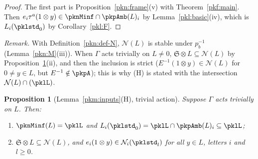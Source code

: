 \documentclass[10pt]{amsart}
\newtheorem{proposition}[theorem]{Proposition}
\theoremstyle{definition}
\theoremstyle{remark}
\begin{document}
\begin{proof}
The first part is Proposition~\ref{pkn:frame}(v) with Theorem~\ref{pkf:main}. Then $e_i\tau^a(1\otimes y)\in
\pknMinf\cap\pkpAmb(L)_i$ by Lemma~\ref{pkl:basic}(iv), which is $L_i(\pklstd_0)$ by Corollary~\ref{pkl:F}.
\end{proof}

\emph{Remark.} With Definition~\ref{pkn:def-N}, $\mathcal N(L)$ is stable under $p_b^{-1}$
(Lemma~\ref{pkn:M}(iii)). When $\Gamma$ acts trivially on $L\ne0$, $\mathfrak S\otimes L\subseteq\mathcal N(L)$
by Proposition~\ref{pkl:H2}(ii), and then the inclusion is strict ($E^{-1}(1\otimes y)\in\mathcal N(L)$ for
$0\ne y\in L$, but $E^{-1}\notin\pkpA$); this is why (H) is stated with the intersection
$\mathcal N(L)\cap(\pklL)$.

\begin{proposition}[Lemma~\ref{pkm:inputs}(H), trivial action]\label{pkl:H2}
Suppose $\Gamma$ acts trivially on $L$. Then:
\begin{enumerate}
\item[(i)] $\pknMinf(L)=\pklL$ and $L_i(\pklstd_0)=\pklL\cap\pkpAmb(L)_i\subseteq\pklL$;
\item[(ii)] $\mathfrak S\otimes L\subseteq\mathcal N(L)$, and $e_i(1\otimes y)\in\mathcal N_i(\pklstd_l)$ for all
$y\in L$, letters $i$ and $l\ge0$.
\end{enumerate}
\end{proposition}
\end{document}
